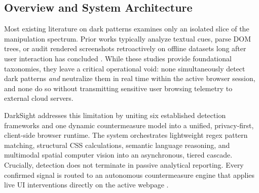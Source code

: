 \documentclass[11pt,a4paper]{article}
\begin{document}
\subsection{Overview and System Architecture}
\label{subsec:overview_arch}

Most existing literature on dark patterns examines only an isolated slice of the manipulation spectrum. Prior works typically analyze textual cues, parse DOM trees, or audit rendered screenshots retroactively on offline datasets long after user interaction has concluded \cite{mathur2019, schaefer2023, aidui2023, 50shades, dpsentinel2024}. While these studies provide foundational taxonomies, they leave a critical operational void: none simultaneously detect dark patterns \textit{and} neutralize them in real time within the active browser session, and none do so without transmitting sensitive user browsing telemetry to external cloud servers.

DarkSight addresses this limitation by uniting six established detection frameworks and one dynamic countermeasure model into a unified, privacy-first, client-side browser runtime. The system orchestrates lightweight regex pattern matching, structural CSS calculations, semantic language reasoning, and multimodal spatial computer vision into an asynchronous, tiered cascade. Crucially, detection does not terminate in passive analytical reporting. Every confirmed signal is routed to an autonomous countermeasure engine that applies live UI interventions directly on the active webpage \cite{schaefer2024}.
\end{document}
